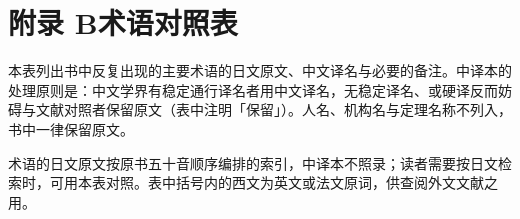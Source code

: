 \chapter*{附录 B\quad 术语对照表}

本表列出书中反复出现的主要术语的日文原文、中文译名与必要的备注。中译本的处理原则是：中文学界有稳定通行译名者用中文译名，无稳定译名、或硬译反而妨碍与文献对照者保留原文（表中注明「保留」）。人名、机构名与定理名称不列入，书中一律保留原文。\par\medskip

术语的日文原文按原书五十音顺序编排的索引，中译本不照录；读者需要按日文检索时，可用本表对照。表中括号内的西文为英文或法文原词，供查阅外文文献之用。\par\medskip

